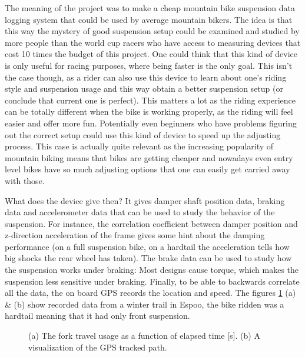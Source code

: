 \documentclass[a4paper,11pt]{article} %
\begin{document}
The meaning of the project was to make a cheap mountain bike suspension data logging system that could be used by average mountain bikers. The idea is that this way the mystery of good suspension setup could be examined and studied by more people than the world cup racers who have access to measuring devices that cost 10 times the budget of this project. One could think that this kind of device is only useful for racing purposes, where being faster is the only goal. This isn't the case though, as a rider can also use this device to learn about one's riding style and suspension usage and this way obtain a better suspension setup (or conclude that current one is perfect). This matters a lot as the riding experience can be totally different when the bike is working properly, as the riding will feel easier and offer more fun. Potentially even beginners who have problems figuring out the correct setup could use this kind of device to speed up the adjusting process. This case is actually quite relevant as the increasing popularity of mountain biking means that bikes are getting cheaper and nowadays even entry level bikes have so much adjusting options that one can easily get carried away with those.

What does the device give then? It gives damper shaft position data, braking data and accelerometer data that can be used to study the behavior of the suspension. For instance, the correlation coefficient between damper position and z-direction acceleration of the frame gives some hint about the damping performance (on a full suspension bike, on a hardtail the acceleration tells how big shocks the rear wheel has taken). The brake data can be used to study how the suspension works under braking: Most designs cause torque, which makes the suspension less sensitive under braking. Finally, to be able to backwards correlate all the data, the on board GPS records the location and speed. The figures \ref{fig:data_plots} (a) \& (b) show recorded data from a winter trail in Espoo, the bike ridden was a hardtail meaning that it had only front suspension.

\begin{figure}[H]
    \hfill
    \hfill
    \hfill
    \caption{(a) The fork travel usage as a function of elapsed time [s]. (b) A visualization of the GPS tracked path.}
    \label{fig:data_plots}
\end{figure}
\end{document}
